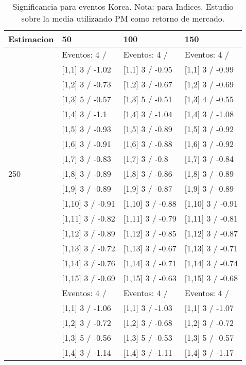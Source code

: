 \begin{table}

\caption{Significancia para eventos Korea. Nota: para Indices. Estudio sobre la media utilizando PM como retorno de mercado.}
\centering
\begin{tabular}[t]{llll}
\toprule
Estimacion & 50 & 100 & 150\\
\midrule
 & Eventos:  4 / & Eventos:  4 / & Eventos:  4 /\\
 & {}[1,1] 3  / -1.02 & {}[1,1] 3  / -0.95 & {}[1,1] 3  / -0.99\\
 & {}[1,2] 3  / -0.73 & {}[1,2] 3  / -0.67 & {}[1,2] 3  / -0.69\\
 & {}[1,3] 5  / -0.57 & {}[1,3] 5  / -0.51 & {}[1,3] 4  / -0.55\\
 & {}[1,4] 3  / -1.1 & {}[1,4] 3  / -1.04 & {}[1,4] 3  / -1.08\\
\addlinespace
 & {}[1,5] 3  / -0.93 & {}[1,5] 3  / -0.89 & {}[1,5] 3  / -0.92\\
 & {}[1,6] 3  / -0.91 & {}[1,6] 3  / -0.88 & {}[1,6] 3  / -0.92\\
 & {}[1,7] 3  / -0.83 & {}[1,7] 3  / -0.8 & {}[1,7] 3  / -0.84\\
250 & {}[1,8] 3  / -0.89 & {}[1,8] 3  / -0.86 & {}[1,8] 3  / -0.89\\
 & {}[1,9] 3  / -0.89 & {}[1,9] 3  / -0.87 & {}[1,9] 3  / -0.89\\
\addlinespace
 & {}[1,10] 3  / -0.91 & {}[1,10] 3  / -0.88 & {}[1,10] 3  / -0.91\\
 & {}[1,11] 3  / -0.82 & {}[1,11] 3  / -0.79 & {}[1,11] 3  / -0.81\\
 & {}[1,12] 3  / -0.89 & {}[1,12] 3  / -0.85 & {}[1,12] 3  / -0.87\\
 & {}[1,13] 3  / -0.72 & {}[1,13] 3  / -0.67 & {}[1,13] 3  / -0.71\\
 & {}[1,14] 3  / -0.76 & {}[1,14] 3  / -0.71 & {}[1,14] 3  / -0.74\\
\addlinespace
 & {}[1,15] 3  / -0.69 & {}[1,15] 3  / -0.63 & {}[1,15] 3  / -0.68\\
 & Eventos:  4 / & Eventos:  4 / & Eventos:  4 /\\
 & {}[1,1] 3  / -1.06 & {}[1,1] 3  / -1.03 & {}[1,1] 3  / -1.07\\
 & {}[1,2] 3  / -0.72 & {}[1,2] 3  / -0.68 & {}[1,2] 3  / -0.72\\
 & {}[1,3] 5  / -0.56 & {}[1,3] 5  / -0.53 & {}[1,3] 5  / -0.57\\
\addlinespace
 & {}[1,4] 3  / -1.14 & {}[1,4] 3  / -1.11 & {}[1,4] 3  / -1.17\\

\end{tabular}
\end{table}
